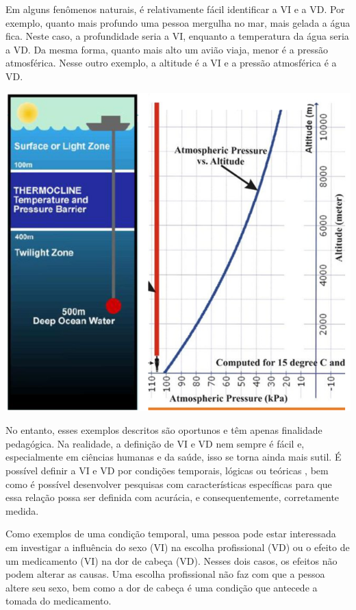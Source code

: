 \documentclass[
]{book}
\begin{document}
Em alguns fenômenos naturais, é relativamente fácil identificar a VI e a VD. Por exemplo, quanto mais profundo uma pessoa mergulha no mar, mais gelada a água fica. Neste caso, a profundidade seria a VI, enquanto a temperatura da água seria a VD. Da mesma forma, quanto mais alto um avião viaja, menor é a pressão atmosférica. Nesse outro exemplo, a altitude é a VI e a pressão atmosférica é a VD.

\includegraphics{./img/cap_vivd_fisica.png}

No entanto, esses exemplos descritos são oportunos e têm apenas finalidade pedagógica. Na realidade, a definição de VI e VD nem sempre é fácil e, especialmente em ciências humanas e da saúde, isso se torna ainda mais sutil. É possível definir a VI e VD por condições temporais, lógicas ou teóricas \citep{BabbieEarlR1990}, bem como é possível desenvolver pesquisas com características específicas para que essa relação possa ser definida com acurácia, e consequentemente, corretamente medida.

Como exemplos de uma condição temporal, uma pessoa pode estar interessada em investigar a influência do sexo (VI) na escolha profissional (VD) ou o efeito de um medicamento (VI) na dor de cabeça (VD). Nesses dois casos, os efeitos não podem alterar as causas. Uma escolha profissional não faz com que a pessoa altere seu sexo, bem como a dor de cabeça é uma condição que antecede a tomada do medicamento.
\end{document}
